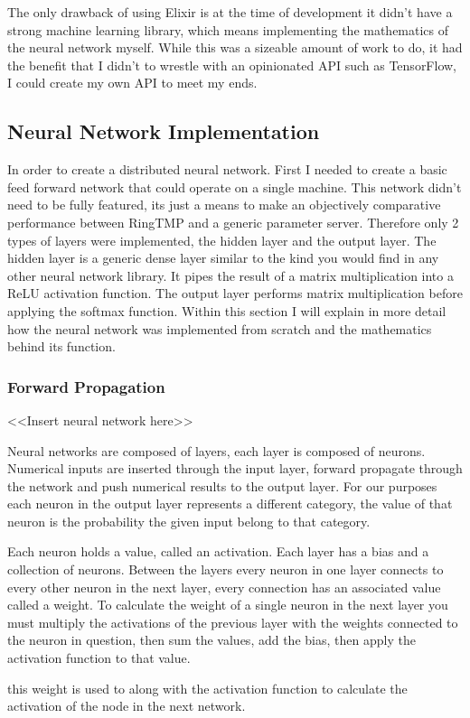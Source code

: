 The only drawback of using Elixir is at the time of development it didn't have a
strong machine learning library, which means implementing the mathematics of the
neural network myself. While this was a sizeable amount of work to do, it had
the benefit that I didn't to wrestle with an opinionated API such as TensorFlow,
I could create my own API to meet my ends.

\subsection{Neural Network Implementation}
In order to create a distributed neural network. First I needed to create a
basic feed forward network that could operate on a single machine. This network
didn't need to be fully featured, its just a means to make an objectively
comparative performance between RingTMP and a generic parameter server.
Therefore only 2 types of layers were implemented, the hidden layer and the
output layer. The hidden layer is a generic dense layer similar to the kind you
would find in any other neural network library. It pipes the result of a matrix
multiplication into a ReLU activation function. The output layer performs matrix
multiplication before applying the softmax function. Within this section I will
explain in more detail how the neural network was implemented from scratch and the
mathematics behind its function.

\subsubsection{Forward Propagation}
<<Insert neural network here>>
\par
Neural networks are composed of layers, each layer is composed of neurons.
Numerical inputs are inserted through the input layer, forward propagate through
the network and push numerical results to the output layer. For our purposes
each neuron in the output layer represents a different category, the value of
that neuron is the probability the given input belong to that category.


Each neuron holds a value, called an activation. Each layer has a bias and a
collection of neurons. Between the layers every neuron in one layer connects to
every other neuron in the next layer, every connection has an associated value
called a weight. To calculate the weight of a single neuron in the next layer
you must multiply the activations of the previous layer with the weights
connected to the neuron in question, then sum the values, add the bias, then
apply the activation function to that value.

this weight is used
to along with the activation function to calculate the activation of the node in
the next network. 